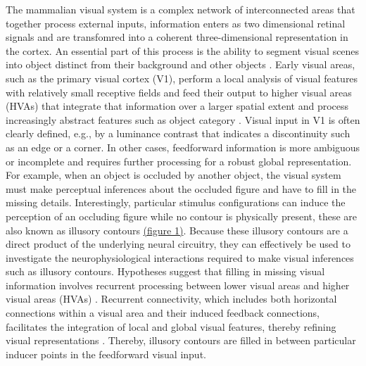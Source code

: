 \documentclass[12pt]{article}
\begin{document}
\setlength{\parindent}{12pt}
The mammalian visual system is a complex network of interconnected areas that together process external inputs, information enters as two dimensional retinal signals and are transfomred into a coherent three-dimensional representation in the cortex. An essential part of this process is the ability to segment visual scenes into object distinct from their background and other objects \autocite{kirchbergerEssentialRoleFeedback2020}. Early visual areas, such as the primary visual cortex (V1), perform a local analysis of visual features with relatively small receptive fields and feed their output to higher visual areas (HVAs) that integrate that information over a larger spatial extent and process increasingly abstract features such as object category \autocite{ashbridgeEffectImageOrientation2000}. Visual input in V1 is often clearly defined, e.g., by a luminance contrast that indicates a discontinuity such as an edge or a corner. In other cases, feedforward information is more ambiguous or incomplete and requires further processing for a robust global representation. For example, when an object is occluded by another object, the visual system must make perceptual inferences about the occluded figure and have to fill in the missing details. Interestingly, particular stimulus configurations can induce the perception of an occluding figure while no contour is physically present, these are also known as illusory contours \hyperref[fig:figure_1]{(figure 1)}. Because these illusory contours are a direct product of the underlying neural circuitry, they can effectively be used to investigate the neurophysiological interactions required to make visual inferences such as illusory contours. Hypotheses suggest that filling in missing visual information involves recurrent processing between lower visual areas and higher visual areas (HVAs) \autocite{wyatteEarlyRecurrentFeedback2014}. Recurrent connectivity, which includes both horizontal connections within a visual area and their induced feedback connections, facilitates the integration of local and global visual features, thereby refining visual representations \autocite{roelfsemaCORTICALALGORITHMSPERCEPTUAL2006,shushruthStrongRecurrentNetworks2012}. Thereby, illusory contours are filled in between particular inducer points in the feedforward visual input.
\setlength{\parindent}{0pt}
\end{document}
